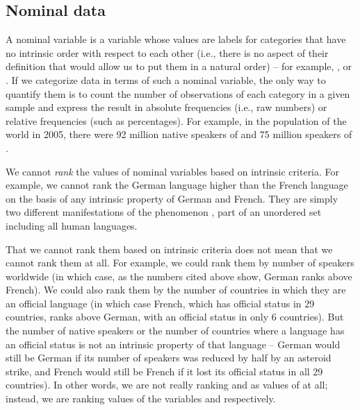 \subsection{Nominal data}
\label{sec:nominaldata}

A nominal  variable is a variable whose values are labels for categories  that have no intrinsic order with respect to each other (i.e., there is no aspect of their definition that would allow us to put them in a natural order) -- for example, ,  or . If we categorize  data in terms of such a nominal  variable, the only way to quantify  them is to count the number of observations  of each category in a given sample and express the result in absolute frequencies  (i.e., raw numbers) or relative frequencies (such as percentages). For example, in the population of the world in 2005, there were 92 million native speakers of  and 75 million speakers of .

We cannot \emph{rank} the values of nominal  variables based on intrinsic criteria. For example, we cannot rank the German language higher than the French language on the basis of any intrinsic property of German and French. They are simply two different manifestations of the phenomenon , part of an unordered set including all human  languages.

That we cannot rank them based on intrinsic criteria does not mean that we cannot rank them at all. For example, we could rank them by number of speakers worldwide (in which case, as the numbers cited above show, German ranks above French). We could also rank them by the number of countries in which they are an official language (in which case French, which has official status in 29 countries, ranks above German, with an official status in only 6 countries). But the number of native speakers or the number of countries where a language has an official status is not an intrinsic property of that language -- German would still be German if its number of speakers was reduced by half by an asteroid strike, and French would still be French if it lost its official status in all 29 countries). In other words,
we are not really ranking  and  as values of  at all; instead, we are ranking values of the variables  and  respectively.

